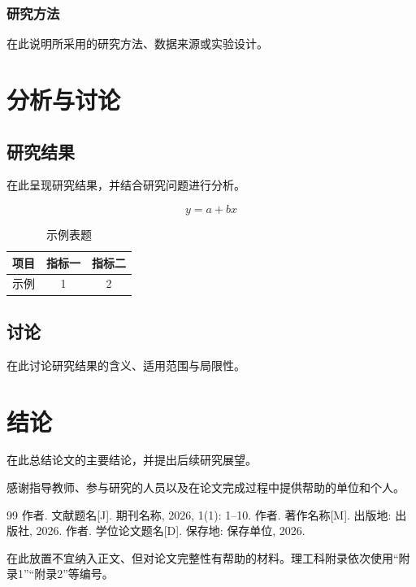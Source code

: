 \documentclass{cqutthesis}
\begin{document}
\subsection{研究方法}
在此说明所采用的研究方法、数据来源或实验设计。

\chapter{分析与讨论}
\section{研究结果}
在此呈现研究结果，并结合研究问题进行分析。

\begin{equation}
  y = a + bx
\end{equation}

\begin{table}[htbp]
  \centering
  \caption{示例表题}
  \begin{tabular}{ccc}
    \toprule
    项目 & 指标一 & 指标二 \\
    \midrule
    示例 & 1 & 2 \\
    \bottomrule
  \end{tabular}
\end{table}


\section{讨论}
在此讨论研究结果的含义、适用范围与局限性。

\chapter{结论}
在此总结论文的主要结论，并提出后续研究展望。

\acknowledgements
感谢指导教师、参与研究的人员以及在论文完成过程中提供帮助的单位和个人。

\begin{thebibliography}{99}
   作者. 文献题名[J]. 期刊名称, 2026, 1(1): 1--10.
   作者. 著作名称[M]. 出版地: 出版社, 2026.
   作者. 学位论文题名[D]. 保存地: 保存单位, 2026.
\end{thebibliography}

在此放置不宜纳入正文、但对论文完整性有帮助的材料。理工科附录依次使用“附录1”“附录2”等编号。
\end{document}
